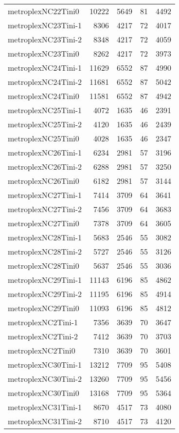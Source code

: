 \begin{longtable}{lrrrr}
metroplexNC22Tini0 & 10222 & 5649 & 81 & 4492 \\
metroplexNC23Tini-1 & 8306 & 4217 & 72 & 4017 \\
metroplexNC23Tini-2 & 8348 & 4217 & 72 & 4059 \\
metroplexNC23Tini0 & 8262 & 4217 & 72 & 3973 \\
metroplexNC24Tini-1 & 11629 & 6552 & 87 & 4990 \\
metroplexNC24Tini-2 & 11681 & 6552 & 87 & 5042 \\
metroplexNC24Tini0 & 11581 & 6552 & 87 & 4942 \\
metroplexNC25Tini-1 & 4072 & 1635 & 46 & 2391 \\
metroplexNC25Tini-2 & 4120 & 1635 & 46 & 2439 \\
metroplexNC25Tini0 & 4028 & 1635 & 46 & 2347 \\
metroplexNC26Tini-1 & 6234 & 2981 & 57 & 3196 \\
metroplexNC26Tini-2 & 6288 & 2981 & 57 & 3250 \\
metroplexNC26Tini0 & 6182 & 2981 & 57 & 3144 \\
metroplexNC27Tini-1 & 7414 & 3709 & 64 & 3641 \\
metroplexNC27Tini-2 & 7456 & 3709 & 64 & 3683 \\
metroplexNC27Tini0 & 7378 & 3709 & 64 & 3605 \\
metroplexNC28Tini-1 & 5683 & 2546 & 55 & 3082 \\
metroplexNC28Tini-2 & 5727 & 2546 & 55 & 3126 \\
metroplexNC28Tini0 & 5637 & 2546 & 55 & 3036 \\
metroplexNC29Tini-1 & 11143 & 6196 & 85 & 4862 \\
metroplexNC29Tini-2 & 11195 & 6196 & 85 & 4914 \\
metroplexNC29Tini0 & 11093 & 6196 & 85 & 4812 \\
metroplexNC2Tini-1 & 7356 & 3639 & 70 & 3647 \\
metroplexNC2Tini-2 & 7412 & 3639 & 70 & 3703 \\
metroplexNC2Tini0 & 7310 & 3639 & 70 & 3601 \\
metroplexNC30Tini-1 & 13212 & 7709 & 95 & 5408 \\
metroplexNC30Tini-2 & 13260 & 7709 & 95 & 5456 \\
metroplexNC30Tini0 & 13168 & 7709 & 95 & 5364 \\
metroplexNC31Tini-1 & 8670 & 4517 & 73 & 4080 \\
metroplexNC31Tini-2 & 8710 & 4517 & 73 & 4120 \\

\end{longtable}
